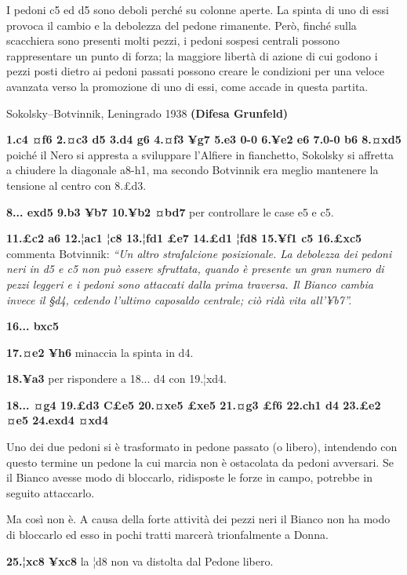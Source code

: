 I pedoni c5 ed d5 sono deboli perché su colonne aperte. La spinta di uno
di essi provoca il cambio e la debolezza del pedone rimanente. Però,
finché sulla scacchiera sono presenti molti pezzi, i pedoni sospesi
centrali possono rappresentare un punto di forza; la maggiore libertà di
azione di cui godono i pezzi posti dietro ai pedoni passati possono
creare le condizioni per una veloce avanzata verso la promozione di uno
di essi, come accade in questa partita.

Sokolsky--Botvinnik, Leningrado 1938 \textbf{(Difesa Grunfeld)}

\textbf{1.c4 ¤f6 2.¤c3 d5 3.d4 g6 4.¤f3 ¥g7 5.e3 0-0 6.¥e2 e6 7.0-0 b6
8.¤xd5} poiché il Nero si appresta a sviluppare l'Alfiere in fianchetto,
Sokolsky si affretta a chiudere la diagonale a8-h1, ma secondo Botvinnik
era meglio mantenere la tensione al centro con 8.£d3.

\textbf{8... exd5 9.b3 ¥b7 10.¥b2 ¤bd7} per controllare le case e5 e c5.

\textbf{11.£c2 a6 12.¦ac1 ¦c8 13.¦fd1 £e7 14.£d1 ¦fd8 15.¥f1 c5 16.£xc5}
commenta Botvinnik: \emph{``Un altro strafalcione posizionale. La
debolezza dei pedoni neri in d5 e c5 non può essere sfruttata, quando è
presente un gran numero di pezzi leggeri e i pedoni sono attaccati dalla
prima traversa. Il Bianco cambia invece il §d4, cedendo l'ultimo
caposaldo centrale; ciò ridà vita all'¥b7''.}

\textbf{16... bxc5}


\textbf{17.¤e2 ¥h6} minaccia la spinta in d4.

\textbf{18.¥a3} per rispondere a 18... d4 con 19.¦xd4.

\textbf{18... ¤g4 19.£d3 C£e5 20.¤xe5 £xe5 21.¤g3 £f6 22.ch1 d4 23.£e2
¤e5 24.exd4 ¤xd4}


Uno dei due pedoni si è trasformato in pedone passato (o libero),
intendendo con questo termine un pedone la cui marcia non è ostacolata
da pedoni avversari. Se il Bianco avesse modo di bloccarlo, ridisposte
le forze in campo, potrebbe in seguito attaccarlo.

Ma così non è. A causa della forte attività dei pezzi neri il Bianco non
ha modo di bloccarlo ed esso in pochi tratti marcerà trionfalmente a
Donna.

\textbf{25.¦xc8 ¥xc8} la ¦d8 non va distolta dal Pedone libero.

